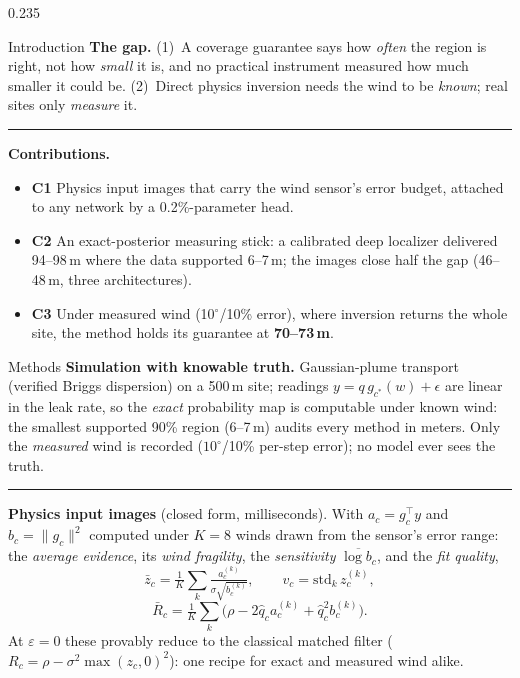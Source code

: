 \documentclass[final]{beamer}
\newcommand{\srule}{\textcolor{accent}{\rule{\linewidth}{1.2mm}}}
\begin{document}
\begin{frame}[t]
\begin{columns}[t]
\begin{column}{0.235\linewidth}
\begin{pbox}{Introduction}
\textbf{The gap.} (1)~A coverage guarantee says how \emph{often} the
region is right, not how \emph{small} it is, and no practical instrument
measured how much smaller it could be. (2)~Direct physics inversion
needs the wind to be \emph{known}; real sites only \emph{measure} it.

\srule

\textbf{Contributions.}
\begin{itemize}[leftmargin=1.1em]
\item \textbf{C1} Physics input images that carry the wind sensor's
error budget, attached to any network by a 0.2\%-parameter head.
\item \textbf{C2} An exact-posterior measuring stick: a calibrated deep
localizer delivered 94--98\,m where the data supported 6--7\,m; the
images close half the gap (46--48\,m, three architectures).
\item \textbf{C3} Under measured wind (10$^\circ$/10\% error), where
inversion returns the whole site, the method holds its guarantee at
\textbf{70--73\,m}.
\end{itemize}
\end{pbox}

\vspace{10mm}

\begin{pbox}{Methods}
\textbf{Simulation with knowable truth.} Gaussian-plume transport
(verified Briggs dispersion) on a 500\,m site; readings
$y = q\,g_{c^\ast}(w) + \epsilon$ are linear in the leak rate, so the
\emph{exact} probability map is computable under known wind: the
smallest supported 90\% region (6--7\,m) audits every method in
meters. Only the \emph{measured} wind is recorded
($10^\circ$/10\% per-step error); no model ever sees the truth.

\srule

\textbf{Physics input images} (closed form, milliseconds). With
$a_c = g_c^\top y$ and $b_c = \lVert g_c\rVert^2$ computed under $K{=}8$
winds drawn from the sensor's error range: the \emph{average evidence},
its \emph{wind fragility}, the \emph{sensitivity}
$\overline{\log b_c}$, and the \emph{fit quality},
\[
\bar z_c = \tfrac{1}{K}\textstyle\sum_k
\tfrac{a_c^{(k)}}{\sigma\sqrt{b_c^{(k)}}},
\qquad v_c = \mathrm{std}_k\, z_c^{(k)},
\]
\[
\bar R_c = \tfrac{1}{K}\textstyle\sum_k
\big(\rho - 2\hat q_c a_c^{(k)} + \hat q_c^2 b_c^{(k)}\big).
\]
At $\varepsilon{=}0$ these provably reduce to the classical matched
filter ($R_c = \rho - \sigma^2\max(z_c,0)^2$): one recipe for exact and
measured wind alike.


\end{pbox}
\end{column}
\end{columns}
\end{frame}
\end{document}

